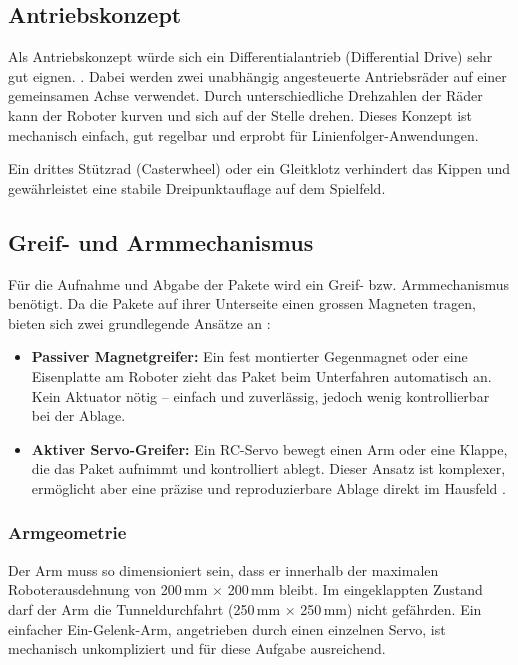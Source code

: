 \documentclass[12pt,a4paper]{article}
\begin{document}
	\subsection{Antriebskonzept}
	
	Als Antriebskonzept würde sich ein Differentialantrieb (Differential Drive) sehr gut eignen. \cite{differential_drive}. Dabei werden zwei unabhängig angesteuerte Antriebsräder auf einer gemeinsamen Achse verwendet. Durch unterschiedliche Drehzahlen der Räder kann der Roboter kurven und sich auf der Stelle drehen. Dieses Konzept ist mechanisch einfach, gut regelbar und erprobt für Linienfolger-Anwendungen.
	
	Ein drittes Stützrad (Casterwheel) oder ein Gleitklotz verhindert das Kippen und gewährleistet eine stabile Dreipunktauflage auf dem Spielfeld.
	
	\subsection{Greif- und Armmechanismus}
	
	Für die Aufnahme und Abgabe der Pakete wird ein Greif- bzw. Armmechanismus benötigt. Da die Pakete auf ihrer Unterseite einen grossen Magneten tragen, bieten sich zwei grundlegende Ansätze an \cite{gripper_mechanism}:
	
	\begin{itemize}
		\item \textbf{Passiver Magnetgreifer:} Ein fest montierter Gegenmagnet oder eine Eisenplatte am Roboter zieht das Paket beim Unterfahren automatisch an. Kein Aktuator nötig – einfach und zuverlässig, jedoch wenig kontrollierbar bei der Ablage.
		\item \textbf{Aktiver Servo-Greifer:} Ein RC-Servo bewegt einen Arm oder eine Klappe, die das Paket aufnimmt und kontrolliert ablegt. Dieser Ansatz ist komplexer, ermöglicht aber eine präzise und reproduzierbare Ablage direkt im Hausfeld \cite{servo_gripper}.
	\end{itemize}
	
	\subsubsection{Armgeometrie}
	
	Der Arm muss so dimensioniert sein, dass er innerhalb der maximalen Roboterausdehnung von 200\,mm $\times$ 200\,mm bleibt. Im eingeklappten Zustand darf der Arm die Tunneldurchfahrt (250\,mm $\times$ 250\,mm) nicht gefährden. Ein einfacher Ein-Gelenk-Arm, angetrieben durch einen einzelnen Servo, ist mechanisch unkompliziert und für diese Aufgabe ausreichend.
	
\end{document}
